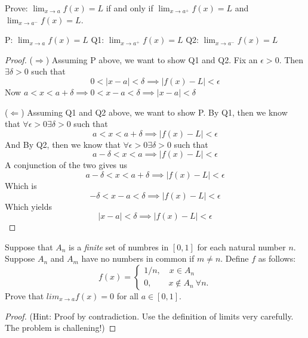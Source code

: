 \documentclass{article} %
\theoremstyle{plain}
\theoremstyle{definition}
\begin{document}
\newpage
\noindent{} Prove: $ \lim_{x \rightarrow a} f(x)=L$ if and only if $ \lim_{x \rightarrow a^+} f(x)=L$ and $ \lim_{x \rightarrow a^-} f(x)=L$.

P: $ \lim_{x \rightarrow a} f(x)=L$
Q1: $ \lim_{x \rightarrow a^+} f(x)=L$
Q2: $ \lim_{x \rightarrow a^-} f(x)=L$

\begin{proof} ($\Rightarrow$)
  Assuming P above, we want to show Q1 and Q2.  Fix an $\epsilon > 0$.
  Then $\exists \delta>0$ such that 
  \[ 0 < |x-a| < \delta \implies |f(x) -L| < \epsilon \]
  Now $a < x < a + \delta \implies 0 < x-a < \delta \implies |x-a| < \delta$

($\Leftarrow$)
  Assuming Q1 and Q2 above, we want to show P.
  By Q1, then we know that $\forall \epsilon > 0 \exists \delta > 0$
  such that 
  \[ a < x < a + \delta \implies |f(x) - L| < \epsilon \]
  And By Q2, then we know that $\forall \epsilon > 0 \exists \delta > 0$
  such that 
  \[ a - \delta < x < a \implies |f(x) - L| < \epsilon \]
  A conjunction of the two gives us
    \[ a - \delta < x < a + \delta \implies |f(x) - L| < \epsilon \]
    Which is
    \[ -\delta < x -a < \delta \implies |f(x) - L| < \epsilon \]
    Which yields
    \[ | x -a| < \delta \implies |f(x) - L| < \epsilon \]
\end{proof} 




\newpage
\noindent{} Suppose that $A_n$ is a \emph{finite} set of numbres in $[0,1]$ for each natural number $n$. Suppose $A_n$ and $A_m$ have no numbers in common if $m\neq n$.  Define $f$ as follows:
\[f(x)= \begin{cases} 1/n
, \quad x \in A_n \\
0, \quad \quad  x\not\in A_n \ \forall n.  \end{cases}\]
Prove that $lim_{x\rightarrow a} f(x)= 0$ for all $a\in [0,1]$. 
\begin{proof} (Hint: Proof by contradiction. Use the definition of limits very carefully. The problem is challening!)
	
\end{proof} 
\end{document}

